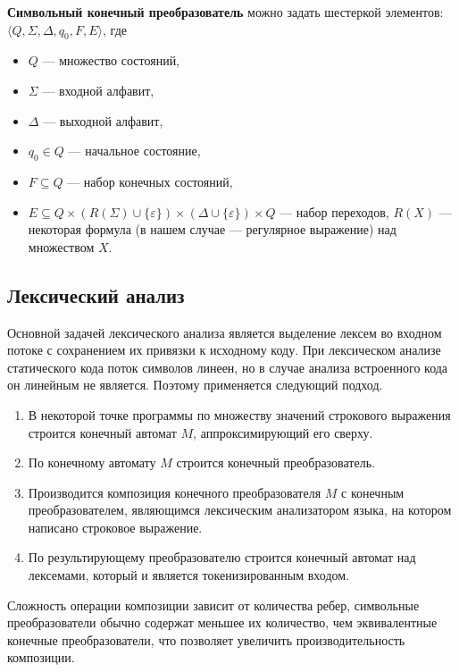 \textbf{Символьный конечный преобразователь} можно задать шестеркой элементов: 
$\langle Q, \Sigma, \Delta, q_0, F, E \rangle$, где

\begin{itemize}
\item $Q$ --- множество состояний, 
\item $\Sigma$ --- входной алфавит, 
\item $\Delta$ --- выходной алфавит, 
\item $q_0 \in Q$ --- начальное состояние, 
\item $F \subseteq Q$ --- набор конечных состояний, 
\item $E \subseteq Q \times (R(\Sigma) \cup \{\varepsilon\}) \times (\Delta \cup \{\varepsilon\})  \times Q$ --- набор переходов, $R(X)$ --- некоторая формула (в нашем случае --- регулярное выражение) над множеством $X$.
\end{itemize}

\subsection{Лексический анализ}
Основной задачей лексического анализа является выделение лексем во входном потоке с сохранением их привязки к исходному коду. При лексическом анализе статического кода поток символов линеен, но в случае анализа встроенного кода он линейным не является. Поэтому применяется следующий подход.

\begin{enumerate}
\item В некоторой точке программы по множеству значений строкового выражения строится конечный автомат $M$, аппроксимирующий его сверху.
\item По конечному автомату $M$ строится конечный преобразователь.
\item Производится композиция конечного преобразователя $M$ с конечным преобразователем, являющимся лексическим анализатором языка, на котором написано строковое выражение.
\item По результирующему преобразователю строится конечный автомат над лексемами, который и является токенизированным входом.
\end{enumerate}

Сложность операции композиции зависит от количества ребер, символьные преобразователи обычно содержат меньшее их количество, чем эквивалентные конечные преобразователи, что позволяет увеличить производительность композиции.

